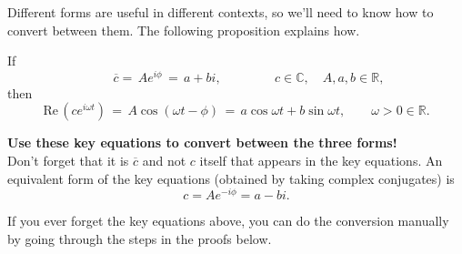 Different forms are useful in different contexts,
so we'll need to know how to convert between them. The following proposition explains how.
\begin{proposition}
  If
  \begin{equation*}
    \qquad \overline{c}=\, A e^{i\phi }\, =\, a+ bi,\,
    \qquad \qquad c\in \mathbb {C}, \quad A,a,b\in \mathbb {R},
  \end{equation*}
  then
  \begin{equation*}
    \mathrm{Re\, }\left(c e^{i\omega t}\right)\, =\,  A\cos (\omega t -\phi )\, =\,
    a\cos \omega t+ b\sin \omega t,\qquad \omega >0\in \mathbb {R}.
  \end{equation*}
\end{proposition}

\textbf{\color{orange} Use these key equations to convert between the three forms!} \\

\Warning Don't forget that it is $\overline{c}$ and not $c$ itself that appears
in the key equations.
An equivalent form of the key equations (obtained by taking complex conjugates) is
\begin{equation*}
  c = Ae^{-i \phi} = a - bi. 
\end{equation*}

If you ever forget the key equations above, you can do the conversion manually by going through the steps in the proofs below.


